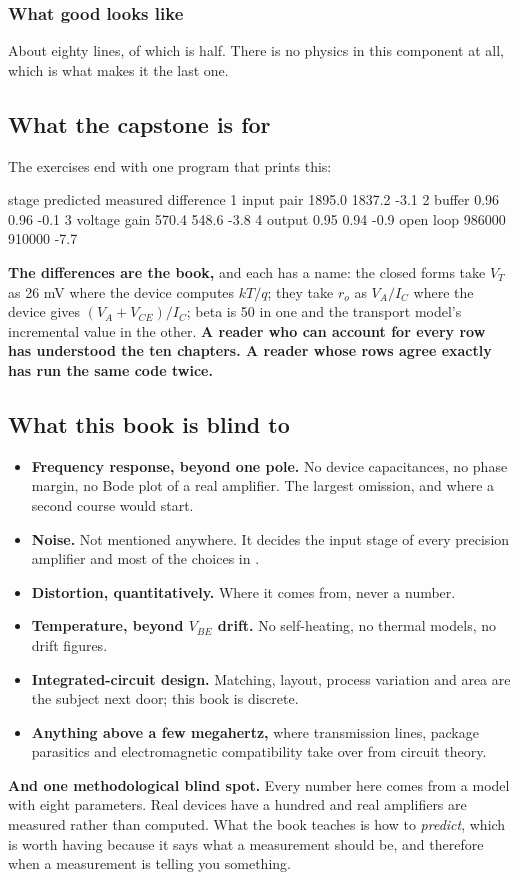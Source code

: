 \subsubsection{What good looks like}
About eighty lines, of which  is half. There is no physics in this component at all, which is what makes it the last one.

\subsection{What the capstone is for}
\label{c10:sec:b7}
The exercises end with one program that prints this:

\begin{console}
stage              predicted     measured    difference
1  input pair         1895.0       1837.2         -3.1 %
2  buffer                0.96         0.96        -0.1 %
3  voltage gain        570.4        548.6         -3.8 %
4  output                0.95         0.94        -0.9 %
open loop            986000       910000         -7.7 %
\end{console}

\textbf{The differences are the book,} and each has a name: the closed forms take $V_T$ as 26 mV where the device computes $kT/q$; they take $r_o$ as $V_A/I_C$ where the device gives $(V_A + V_{CE})/I_C$; beta is 50 in one and the transport model's incremental value in the other. \textbf{A reader who can account for every row has understood the ten chapters. A reader whose rows agree exactly has run the same code twice.}

\subsection{What this book is blind to}
\label{c10:sec:b8}
\begin{itemize}
  \item \textbf{Frequency response, beyond one pole.} No device capacitances, no phase margin, no Bode plot of a real amplifier. The largest omission, and where a second course would start.
  \item \textbf{Noise.} Not mentioned anywhere. It decides the input stage of every precision amplifier and most of the choices in .
  \item \textbf{Distortion, quantitatively.} Where it comes from, never a number.
  \item \textbf{Temperature, beyond $V_{BE}$ drift.} No self-heating, no thermal models, no drift figures.
  \item \textbf{Integrated-circuit design.} Matching, layout, process variation and area are the subject next door; this book is discrete.
  \item \textbf{Anything above a few megahertz,} where transmission lines, package parasitics and electromagnetic compatibility take over from circuit theory.
\end{itemize}
\textbf{And one methodological blind spot.} Every number here comes from a model with eight parameters. Real devices have a hundred and real amplifiers are measured rather than computed. What the book teaches is how to \emph{predict}, which is worth having because it says what a measurement should be, and therefore when a measurement is telling you something.
